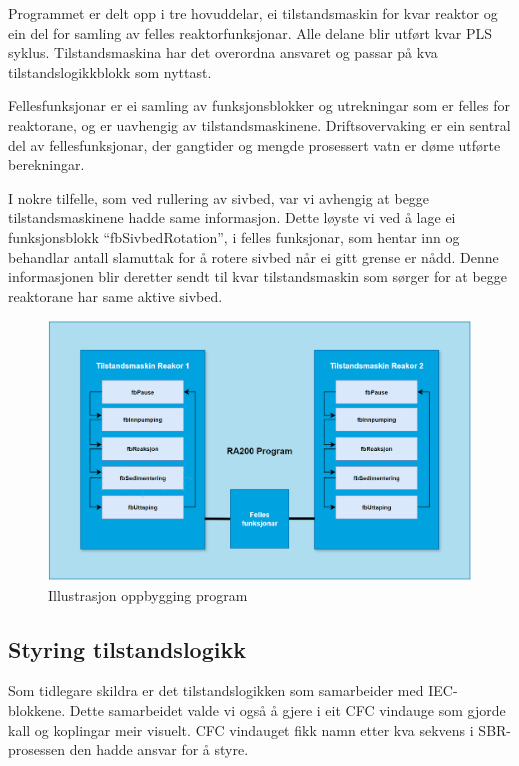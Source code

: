 Programmet er delt opp i tre hovuddelar, ei tilstandsmaskin for kvar reaktor og ein del for samling av felles reaktorfunksjonar.
Alle delane blir utført kvar \gls{PLS} syklus. 
Tilstandsmaskina har det overordna ansvaret og passar på kva tilstandslogikkblokk som nyttast.

Fellesfunksjonar er ei samling av funksjonsblokker og utrekningar som er felles for reaktorane, og er uavhengig av tilstandsmaskinene.
Driftsovervaking er ein sentral del av fellesfunksjonar, der gangtider og mengde prosessert vatn er døme utførte berekningar.

I nokre tilfelle, som ved rullering av sivbed, var vi avhengig at begge tilstandsmaskinene hadde same informasjon.
Dette løyste vi ved å lage ei funksjonsblokk ``fbSivbedRotation'', i felles funksjonar, som hentar inn og behandlar antall slamuttak for å rotere sivbed når ei gitt grense er nådd.
Denne informasjonen blir deretter sendt til kvar tilstandsmaskin som sørger for at begge reaktorane har same aktive sivbed.

\begin{figure}[htbp]
    \centering
    \includegraphics[width=1\textwidth]{Figurar/Oppbygging_Program.png}
    \caption{Illustrasjon oppbygging program}\label{fig:OppbyggingProgram}
\end{figure}

\newpage

\subsection{Styring tilstandslogikk}

Som tidlegare skildra er det tilstandslogikken som samarbeider med \gls{IEC}-blokkene. Dette samarbeidet valde vi også å gjere i eit
\gls{CFC} vindauge som gjorde kall og koplingar meir visuelt. \gls{CFC} vindauget fikk namn etter kva sekvens i \gls{SBR}-prosessen
den hadde ansvar for å styre. 

